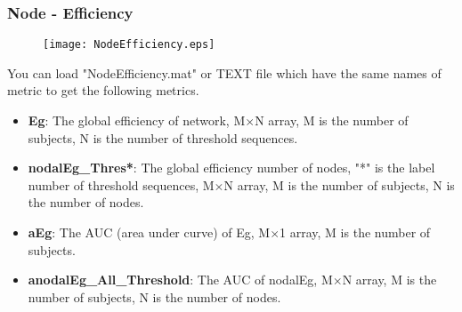 \documentclass[11pt]{article}
\begin{document}
			\subsubsection{Node - Efficiency}
				\begin{figure}
					\begin{center}
						\texttt{[image: NodeEfficiency.eps]}
					\end{center}
				\end{figure}
				You can load "NodeEfficiency.mat" or TEXT file which have the same names of metric to get the following metrics.
				\begin{itemize}
					\item \textbf{Eg}: The global efficiency of network,
						M$\times$N array, M is the number of subjects, N is the number of threshold sequences.
					\item \textbf{nodalEg\_Thres*}: The global efficiency number of nodes, "*" is the label number of threshold sequences,
						M$\times$N array, M is the number of subjects, N is the number of nodes.
					\item \textbf{aEg}: The AUC (area under curve) of Eg,
						M$\times$1 array, M is the number of subjects.
					\item \textbf{anodalEg\_All\_Threshold}: The AUC of nodalEg,
						M$\times$N array, M is the number of subjects, N is the number of nodes.
				\end{itemize}
\end{document}
